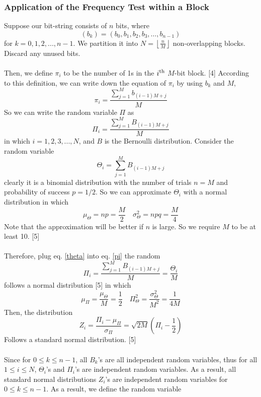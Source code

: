 \documentclass[a4paper,12pt]{article}
\begin{document}
\subsubsection{Application of the Frequency Test within a Block}
\noindent Suppose our bit-string consists of $n$ bits, where
$$\left(b_{k}\right)=(b_0,b_1,b_2,b_3,\dots ,b_{n-1})$$
for $k=0,1,2,...,n-1$. We partition it into $N=\left\lfloor\frac{n}{M}\right\rfloor$ non-overlapping blocks. Discard any unused bits. \\\\
Then, we define $\pi_i$ to be the number of 1s in the $i^{\rm th}$ $M$-bit block. [4] According to this definition, we can write down the equation of $\pi_i$ by using $b_k$ and $M$,
\begin{equation}\label{xiaopi}
\pi_{i}=\frac{\sum_{j=1}^{M} b_{(i-1) M+j}}{M}
\end{equation}
So we can write the random variable $\Pi$ as
\begin{equation}\label{pi}
\Pi_{i}=\frac{\sum_{j=1}^{M} B_{(i-1) M+j}}{M}
\end{equation}
in which $i=1,2,3,...,N$, and $B$ is the Bernoulli distribution. Consider the random variable \begin{equation}\label{theta}
\Theta_i=\sum_{j=1}^{M} B_{(i-1) M+j}
\end{equation}
 clearly it is a binomial distribution with the number of trials $n=M$ and probability of success $p=1/2$. So we can approximate $\Theta_i$ with a normal distribution in which
$$\mu_\Theta=np=\frac{M}{2}\quad\sigma^2_\Theta=npq=\frac{M}{4}$$
Note that the approximation will be better if $n$ is large. So we require $M$ to be at least 10. [5] \\\\
Therefore, plug eq. \eqref{theta} into eq. \eqref{pi} the random
$$
\Pi_{i}=\frac{\sum_{j=1}^{M} B_{(i-1) M+j}}{M}=\frac{\Theta_i}{M}
$$
follows a normal distribution [5] in which
$$\mu_\Pi=\frac{\mu_\Theta}{M}=\frac{1}{2}\quad\Pi^2_\Theta=\frac{\sigma^2_\Theta}{M^2}=\frac{1}{4M}$$
Then, the distribution
$$
Z_i =\frac{\Pi_i-\mu_\Pi}{\sigma_\Pi}=\sqrt{2M}(\Pi_i-\frac{1}{2})
$$
Follows a standard normal distribution. [5] \\\\
Since for $0\leq k\leq n-1$, all $B_k$'s are all independent random variables, thus for all $1\leq i\leq N$, $\Theta_i$'s and $\Pi_i$'s are independent random variables. As a result, all standard normal distributions $Z_i$'s are independent random variables for $0\leq k\leq n-1$. As a result, we define the random variable
\end{document}
